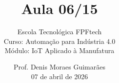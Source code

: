 \title{Aula 06/15}

\subtitle{
\vspace{1.0cm}
Escola Tecnológica FPFtech\\
\vspace{0.5cm}
Curso: Automação para Indústria 4.0\\
\vspace{0.5cm}
Módulo: IoT Aplicado à Manufatura
\vspace{1.0cm}
}

\author{
Prof. Denis Moraes Guimarães\\
\small 07 de abril de 2026
}

\date{}